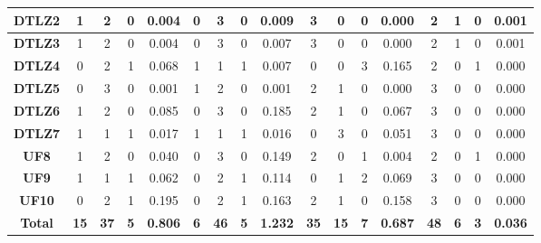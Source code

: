 \begin{table*}[t]
\begin{tabular}{c|c|c|c|c|c|c|c|c|c|c|c|c|c|c|c|c|}
\multicolumn{1}{|c|}{\textbf{DTLZ2}} & 1 & 2 & 0 & 0.004 & 0 & 3 & 0 & 0.009 & 3 & 0 & 0 & 0.000 & 2 & 1 & 0 & 0.001 \\ \hline
\multicolumn{1}{|c|}{\textbf{DTLZ3}} & 1 & 2 & 0 & 0.004 & 0 & 3 & 0 & 0.007 & 3 & 0 & 0 & 0.000 & 2 & 1 & 0 & 0.001 \\ \hline
\multicolumn{1}{|c|}{\textbf{DTLZ4}} & 0 & 2 & 1 & 0.068 & 1 & 1 & 1 & 0.007 & 0 & 0 & 3 & 0.165 & 2 & 0 & 1 & 0.000 \\ \hline
\multicolumn{1}{|c|}{\textbf{DTLZ5}} & 0 & 3 & 0 & 0.001 & 1 & 2 & 0 & 0.001 & 2 & 1 & 0 & 0.000 & 3 & 0 & 0 & 0.000 \\ \hline
\multicolumn{1}{|c|}{\textbf{DTLZ6}} & 1 & 2 & 0 & 0.085 & 0 & 3 & 0 & 0.185 & 2 & 1 & 0 & 0.067 & 3 & 0 & 0 & 0.000 \\ \hline
\multicolumn{1}{|c|}{\textbf{DTLZ7}} & 1 & 1 & 1 & 0.017 & 1 & 1 & 1 & 0.016 & 0 & 3 & 0 & 0.051 & 3 & 0 & 0 & 0.000 \\ \hline
\multicolumn{1}{|c|}{\textbf{UF8}} & 1 & 2 & 0 & 0.040 & 0 & 3 & 0 & 0.149 & 2 & 0 & 1 & 0.004 & 2 & 0 & 1 & 0.000 \\ \hline
\multicolumn{1}{|c|}{\textbf{UF9}} & 1 & 1 & 1 & 0.062 & 0 & 2 & 1 & 0.114 & 0 & 1 & 2 & 0.069 & 3 & 0 & 0 & 0.000 \\ \hline
\multicolumn{1}{|c|}{\textbf{UF10}} & 0 & 2 & 1 & 0.195 & 0 & 2 & 1 & 0.163 & 2 & 1 & 0 & 0.158 & 3 & 0 & 0 & 0.000 \\ \hline
\multicolumn{1}{|c|}{\textbf{Total}} & \textbf{15} & \textbf{37} & \textbf{5} & \textbf{0.806} & \textbf{6} & \textbf{46} & \textbf{5} & \textbf{1.232} & \textbf{35} & \textbf{15} & \textbf{7} & \textbf{0.687} & \textbf{48} & \textbf{6} & \textbf{3} & \textbf{0.036} \\ \hline
\end{tabular}%
\end{table*}

